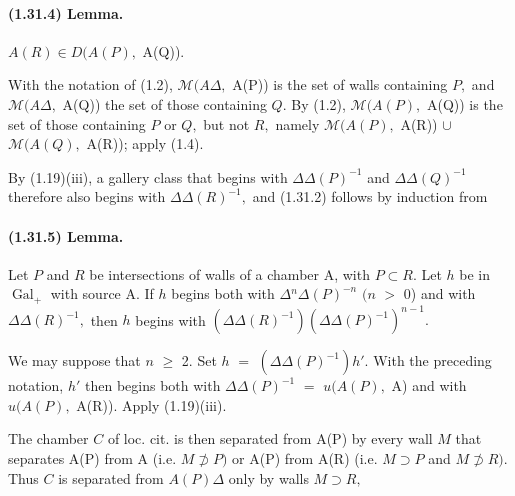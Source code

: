 \documentclass[10pt,a4paper]{article}
\begin{document}
\paragraph{(1.31.4) Lemma.} \ensuremath{A(R)\in{}D(A(P),} A(Q)).

With the notation of (1.2), \ensuremath{\mathcal{M}(A\Delta{},} A(P)) is the set of walls containing \ensuremath{P,} and \ensuremath{\mathcal{M}(A\Delta{},} A(Q)) the set of those containing \ensuremath{Q.} By (1.2), \ensuremath{\mathcal{M}(A(P),} A(Q)) is the set of those containing \ensuremath{P} or \ensuremath{Q,} but not \ensuremath{R,} namely \ensuremath{\mathcal{M}(A(P),} A(R)) \ensuremath{\cup{}} \ensuremath{\mathcal{M}(A(Q),} A(R)); apply (1.4).\par

By (1.19)(iii), a gallery class that begins with \ensuremath{\Delta{}\Delta{}(P)^{-1}} and \ensuremath{\Delta{}\Delta{}(Q)^{-1}} therefore also begins with \ensuremath{\Delta{}\Delta{}(R)^{-1},} and (1.31.2) follows by induction from\par

\paragraph{(1.31.5) Lemma.} Let \ensuremath{P} and \ensuremath{R} be intersections of walls of a chamber A, with \ensuremath{P\subset{}R.} Let \ensuremath{h} be in \ensuremath{\operatorname{Gal}_+} with source A. If \ensuremath{h} begins both with \ensuremath{\Delta{}^n\Delta{}(P)^{-n}} \ensuremath{(n} \ensuremath{>} 0) and with \ensuremath{\Delta{}\Delta{}(R)^{-1},} then \ensuremath{h} begins with \ensuremath{(\Delta{}\Delta{}(R)^{-1})(\Delta{}\Delta{}(P)^{-1})^{n-1}.}

We may suppose that \ensuremath{n} \ensuremath{\ge{}} 2. Set \ensuremath{h} \ensuremath{=} \ensuremath{(\Delta{}\Delta{}(P)^{-1})h'.} With the preceding notation, \ensuremath{h'} then begins both with \ensuremath{\Delta{}\Delta{}(P)^{-1}} \ensuremath{=} \ensuremath{u(A(P),} A) and with \ensuremath{u(A(P),} A(R)). Apply (1.19)(iii).\par

The chamber \ensuremath{C} of loc. cit. is then separated from A(P) by every wall \ensuremath{M} that separates A(P) from A (i.e. \ensuremath{M\not\supset{}P)} or A(P) from A(R) (i.e. \ensuremath{M\supset{}P} and \ensuremath{M\not\supset{}R).} Thus \ensuremath{C} is separated from \ensuremath{A(P)\Delta{}} only by walls \ensuremath{M\supset{}R,}\par
\end{document}
